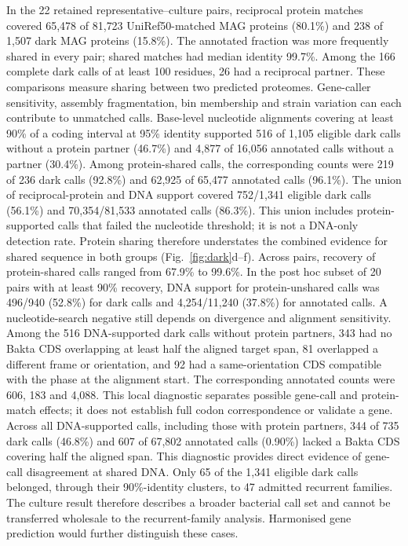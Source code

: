 \documentclass[11pt]{article}
\begin{document}
In the 22 retained representative--culture pairs, reciprocal protein matches covered 65{,}478
of 81{,}723 UniRef50-matched MAG proteins (80.1\%) and 238 of 1{,}507 dark MAG proteins (15.8\%).
The annotated fraction was more frequently shared in every pair; shared matches had median
identity 99.7\%. Among the 166 complete dark calls of at least 100 residues, 26 had a reciprocal
partner. These comparisons measure sharing between two predicted proteomes. Gene-caller
sensitivity, assembly fragmentation, bin membership and strain variation can each contribute to
unmatched calls. Base-level nucleotide alignments covering at least 90\% of a coding interval
at 95\% identity supported 516 of 1{,}105 eligible dark calls without a protein partner (46.7\%)
and 4{,}877 of 16{,}056 annotated calls without a partner (30.4\%). Among protein-shared calls,
the corresponding counts were 219 of 236 dark calls (92.8\%) and 62{,}925 of 65{,}477 annotated
calls (96.1\%). The union of reciprocal-protein and DNA support covered 752/1{,}341 eligible dark calls (56.1\%) and 70{,}354/81{,}533 annotated calls (86.3\%). This union includes protein-supported calls that failed the nucleotide threshold; it is not a DNA-only detection rate. Protein sharing therefore understates the combined evidence for shared sequence in both groups (Fig.~\ref{fig:dark}d--f). Across pairs, recovery of protein-shared calls ranged from 67.9\% to 99.6\%. In the post hoc subset of 20 pairs with at least 90\% recovery, DNA support for protein-unshared calls was 496/940 (52.8\%) for dark calls and 4{,}254/11{,}240 (37.8\%) for annotated calls.
A nucleotide-search negative still depends on divergence and alignment sensitivity.
Among the 516 DNA-supported dark calls without protein partners, 343 had no Bakta CDS
overlapping at least half the aligned target span, 81 overlapped a different frame or orientation,
and 92 had a same-orientation CDS compatible with the phase at the alignment start. The corresponding
annotated counts were 606, 183 and 4{,}088. This local diagnostic separates possible gene-call
and protein-match effects; it does not establish full codon correspondence or validate a gene.
Across all DNA-supported calls, including those with protein partners, 344 of 735 dark calls
(46.8\%) and 607 of 67{,}802 annotated calls (0.90\%) lacked a Bakta CDS covering half the aligned
span. This diagnostic provides direct evidence of gene-call disagreement at shared DNA.
Only 65 of the 1{,}341 eligible dark calls belonged, through their 90\%-identity clusters, to
47 admitted recurrent families. The culture result therefore describes a broader bacterial
call set and cannot be transferred wholesale to the recurrent-family analysis.
Harmonised gene prediction would further distinguish these cases.
\end{document}
